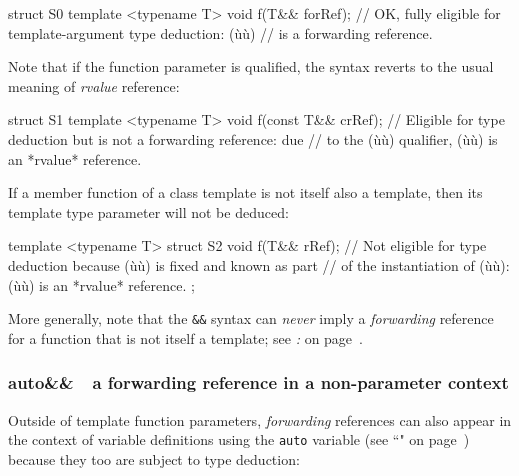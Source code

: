 \begin{emcppslisting}
struct S0
{
    template <typename T>
    void f(T&& forRef);
        // OK, fully eligible for template-argument type deduction: (ù{}ù)
        // is a forwarding reference.
}
\end{emcppslisting}

\noindent Note that if the function parameter is qualified, the syntax reverts to
the usual meaning of \emph{rvalue} reference:

\begin{emcppslisting}
struct S1
{
    template <typename T>
    void f(const T&& crRef);
        // Eligible for type deduction but is not a forwarding reference: due
        // to the (ù{}ù) qualifier, (ù{}ù) is an *rvalue* reference.
}
\end{emcppslisting}

\noindent If a member function of a class template is not itself also a template,
then its template type parameter will not be deduced:

\begin{emcppslisting}
template <typename T>
struct S2
{
    void f(T&& rRef);
       // Not eligible for type deduction because (ù{}ù) is fixed and known as part
       // of the instantiation of (ù{}ù): (ù{}ù) is an *rvalue* reference.
};
\end{emcppslisting}

\noindent More generally, note that the \texttt{\&\&} syntax can \emph{never}
imply a \emph{forwarding} reference for a function that is not itself a
template; see \textit{:
} on page~\pageref{forwarding-references-look-just-like-rvalue-references}.

\subsubsection[{\tt auto\&\&} --- a forwarding reference in a non-parameter context]{{\SubsubsecCode auto\&\&}~{\subsubemdash}~a forwarding reference in a non-parameter context}\label{auto-a-forwarding-reference-in-a-non-parameter-context}

Outside of template function parameters, \emph{forwarding} references
can also appear in the context of variable definitions using the
\texttt{auto} variable (see ``" on page~\pageref{auto-feature}) because they too are subject to type
deduction:

